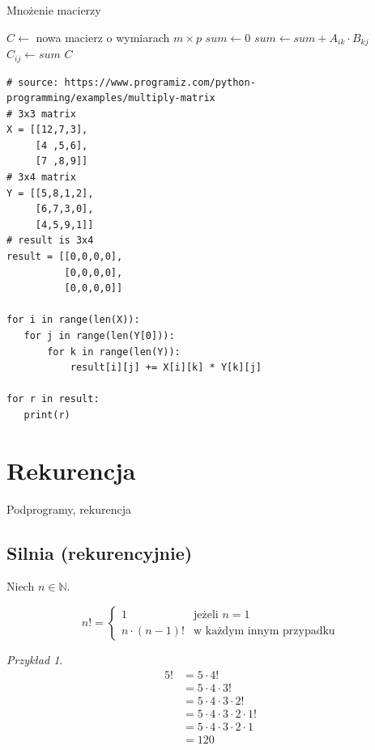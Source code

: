 \documentclass[10pt, oneside]{article}
\theoremstyle{remark}
\newtheorem*{example}{Przykład}
\begin{document}
\begin{algorithm}
    \caption{Mnożenie macierzy}
    \label{matmul}
    \begin{algorithmic}[1] %
            \State $C \gets $ nowa macierz o wymiarach $m \times p$
            			\State $sum \gets 0$
            				\State $sum \gets sum + A_{ik}\cdot B_{kj}$
	             	\EndFor
	             	\State $C_{ij} \gets sum$
	            	\EndFor
            	\EndFor
            \State \Return $C$
        \EndFunction
    \end{algorithmic}
\end{algorithm}

\begin{verbatim}
# source: https://www.programiz.com/python-programming/examples/multiply-matrix
# 3x3 matrix
X = [[12,7,3],
     [4 ,5,6],
     [7 ,8,9]]
# 3x4 matrix
Y = [[5,8,1,2],
     [6,7,3,0],
     [4,5,9,1]]
# result is 3x4
result = [[0,0,0,0],
          [0,0,0,0],
          [0,0,0,0]]

for i in range(len(X)):
   for j in range(len(Y[0])):
       for k in range(len(Y)):
           result[i][j] += X[i][k] * Y[k][j]

for r in result:
   print(r)
\end{verbatim}


\section{Rekurencja}

Podprogramy, rekurencja

\subsection{Silnia (rekurencyjnie)}
Niech $n \in \mathbb{N}$.

\begin{equation*}
n! = \begin{cases}
1 &\text{jeżeli $n =1 $}\\
n\cdot (n-1)! &\text{w każdym innym przypadku}
\end{cases}
\end{equation*}

\begin{example}

\begin{align*}
5! &= 5 \cdot 4! \\
&= 5 \cdot 4 \cdot 3! \\  
&= 5 \cdot 4 \cdot 3 \cdot 2! \\  
&= 5 \cdot 4 \cdot 3 \cdot 2 \cdot 1! \\
&= 5 \cdot 4 \cdot 3 \cdot 2 \cdot 1 \\
&= 120
\end{align*}

\end{example}
\end{document}
